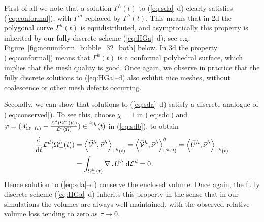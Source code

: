 First of all we note that a solution $\Gamma^h(t)$ to (\ref{eq:sda}--d) clearly
satisfies (\ref{eq:conformal}), with $\Gamma^m$ replaced by $\Gamma^h(t)$. This
means that in 2d the polygonal curve $\Gamma^h(t)$ is equidistributed, and
asymptotically this property is inherited by our fully discrete scheme
(\ref{eq:HGa}--d); see e.g. Figure~\ref{fig:nonuniform_bubble_32_both} below.
In 3d the property (\ref{eq:conformal}) means that $\Gamma^h(t)$ is a
conformal polyhedral surface, which implies that the mesh quality is good. Once
again, we observe in practice that the fully discrete solutions to
(\ref{eq:HGa}--d) also exhibit nice meshes, without coalescence or other
mesh defects occurring.

Secondly, we can show that solutions to (\ref{eq:sda}--d) satisfy a discrete
analogue of (\ref{eq:conserved}). To see this, choose $\chi = 1$ in
(\ref{eq:sdc}) and $\varphi= (\mathrm{\mathcal{X}}_{\Omega_-^h(t)} -
\frac{\mathcal{L}^d(\Omega_-^h(t))}{\mathcal{L}^d(\Omega)})
\in \widetilde{\mathbb{P}}^h(t)$ in (\ref{eq:sdb}), to obtain
\begin{align}\label{eq:stokes_volume_semidiscrete}
\frac{\rm d}{{\rm d}t} \mathcal{L}^d(\Omega_-^h(t))  &=
\left\langle \vec{\mathcal{V}}^h , \vec\nu^h \right\rangle_{\Gamma^h(t)}
= \left\langle \vec{\mathcal{V}}^h , \vec\nu^h \right\rangle^h_{\Gamma^h(t)}
= \left\langle \vec U^h, \vec\nu^h \right\rangle_{\Gamma^h(t)} \\ &
= \int_{\Omega_-^h(t)} \nabla\,.\,\vec U^h \;{\rm d}{\cal L}^{d} =0\,.
\end{align}
Hence solution to (\ref{eq:sda}--d) conserve the enclosed volume. Once again,
the fully discrete scheme (\ref{eq:HGa}--d) inherits this property in the sense
that in our simulations the volumes are always well maintained, with the
observed relative volume loss tending to zero as $\tau\to 0$.

